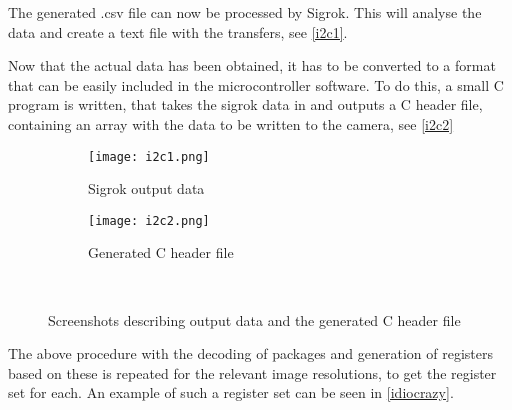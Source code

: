 The generated .csv file can now be processed by Sigrok. This will analyse the data and create a text file with the \iic transfers, see \autoref{i2c1}.

Now that the actual \iic data has been obtained, it has to be converted to a format that can be easily included in the microcontroller software. To do this, a small C program is written, that takes the sigrok data in and outputs a C header file, containing an array with the data to be written to the camera, see \autoref{i2c2}


\begin{figure}[H]
	\centering
	\begin{subfigure}{.45\textwidth}
		\centering
		\texttt{[image: i2c1.png]}
		\caption{Sigrok output data}
		\label{i2c1}
	\end{subfigure}
	\hfill
	\begin{subfigure}{.45\textwidth}
		\centering
		\texttt{[image: i2c2.png]}
		\caption{Generated C header file}
		\label{i2c2}
	\end{subfigure}\\
		\caption{Screenshots describing output data and the generated C header file}
	\label{screenshot_computer}
\end{figure}



The above procedure with the decoding of \iic packages and generation of registers based on these is repeated for the relevant image resolutions, to get the register set for each. An example of such a register set can be seen in \autoref{idiocrazy}.

